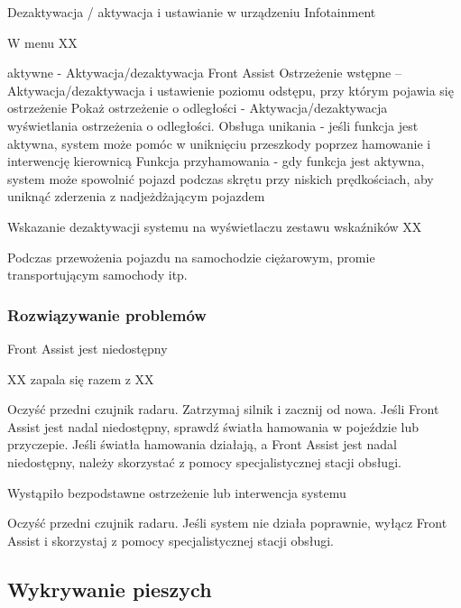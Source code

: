 Dezaktywacja / aktywacja i ustawianie w urządzeniu Infotainment

W menu XX
\begin{itemizeTriangle}
	\itemTriangle aktywne - Aktywacja/dezaktywacja Front Assist
	\itemTriangle Ostrzeżenie wstępne – Aktywacja/dezaktywacja i ustawienie poziomu odstępu, przy którym pojawia się ostrzeżenie
	\itemTriangle Pokaż ostrzeżenie o odległości - Aktywacja/dezaktywacja wyświetlania ostrzeżenia o odległości.
	\itemTriangle Obsługa unikania - jeśli funkcja jest aktywna, system może pomóc w uniknięciu przeszkody poprzez hamowanie i interwencję kierownicą
	\itemTriangle Funkcja przyhamowania - gdy funkcja jest aktywna, system może spowolnić pojazd podczas skrętu przy niskich prędkościach, aby uniknąć zderzenia z nadjeżdżającym pojazdem
\end{itemizeTriangle}

Wskazanie dezaktywacji systemu na wyświetlaczu zestawu wskaźników XX

Podczas przewożenia pojazdu na samochodzie ciężarowym, promie transportującym samochody itp.

\subsubsection{Rozwiązywanie problemów}

Front Assist jest niedostępny

XX zapala się razem z XX

\begin{itemizeArrow}
	\itemArrow Oczyść przedni czujnik radaru.
	\itemArrow Zatrzymaj silnik i zacznij od nowa.
	\itemArrow Jeśli Front Assist jest nadal niedostępny, sprawdź światła hamowania w pojeździe lub przyczepie.
	\itemArrow Jeśli światła hamowania działają, a Front Assist jest nadal niedostępny, należy skorzystać z pomocy specjalistycznej stacji obsługi.
\end{itemizeArrow}
Wystąpiło bezpodstawne ostrzeżenie lub interwencja systemu
\begin{itemizeArrow}
	\itemArrow Oczyść przedni czujnik radaru.
	\itemArrow Jeśli system nie działa poprawnie, wyłącz Front Assist i skorzystaj z pomocy specjalistycznej stacji obsługi.
\end{itemizeArrow}

\subsection{Wykrywanie pieszych}

